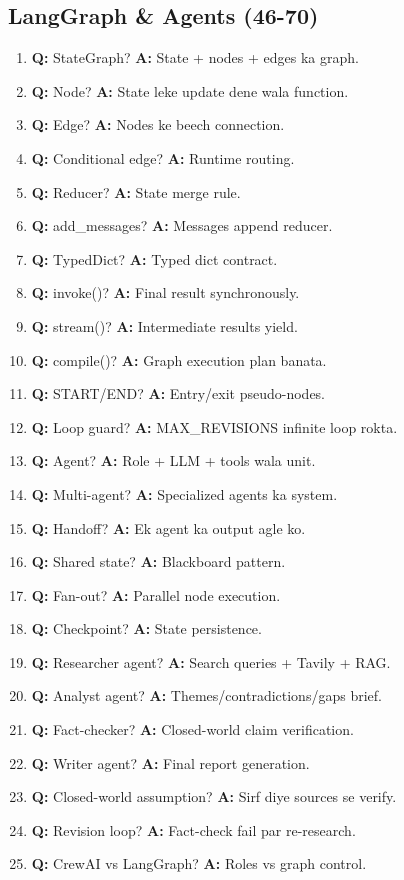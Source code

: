 \subsection{LangGraph \& Agents (46-70)}

\begin{enumerate}[label=\arabic*.]
\item \textbf{Q:} StateGraph? \textbf{A:} State + nodes + edges ka graph.
\item \textbf{Q:} Node? \textbf{A:} State leke update dene wala function.
\item \textbf{Q:} Edge? \textbf{A:} Nodes ke beech connection.
\item \textbf{Q:} Conditional edge? \textbf{A:} Runtime routing.
\item \textbf{Q:} Reducer? \textbf{A:} State merge rule.
\item \textbf{Q:} add\_messages? \textbf{A:} Messages append reducer.
\item \textbf{Q:} TypedDict? \textbf{A:} Typed dict contract.
\item \textbf{Q:} invoke()? \textbf{A:} Final result synchronously.
\item \textbf{Q:} stream()? \textbf{A:} Intermediate results yield.
\item \textbf{Q:} compile()? \textbf{A:} Graph execution plan banata.
\item \textbf{Q:} START/END? \textbf{A:} Entry/exit pseudo-nodes.
\item \textbf{Q:} Loop guard? \textbf{A:} MAX\_REVISIONS infinite loop rokta.
\item \textbf{Q:} Agent? \textbf{A:} Role + LLM + tools wala unit.
\item \textbf{Q:} Multi-agent? \textbf{A:} Specialized agents ka system.
\item \textbf{Q:} Handoff? \textbf{A:} Ek agent ka output agle ko.
\item \textbf{Q:} Shared state? \textbf{A:} Blackboard pattern.
\item \textbf{Q:} Fan-out? \textbf{A:} Parallel node execution.
\item \textbf{Q:} Checkpoint? \textbf{A:} State persistence.
\item \textbf{Q:} Researcher agent? \textbf{A:} Search queries + Tavily + RAG.
\item \textbf{Q:} Analyst agent? \textbf{A:} Themes/contradictions/gaps brief.
\item \textbf{Q:} Fact-checker? \textbf{A:} Closed-world claim verification.
\item \textbf{Q:} Writer agent? \textbf{A:} Final report generation.
\item \textbf{Q:} Closed-world assumption? \textbf{A:} Sirf diye sources se verify.
\item \textbf{Q:} Revision loop? \textbf{A:} Fact-check fail par re-research.
\item \textbf{Q:} CrewAI vs LangGraph? \textbf{A:} Roles vs graph control.
\end{enumerate}


